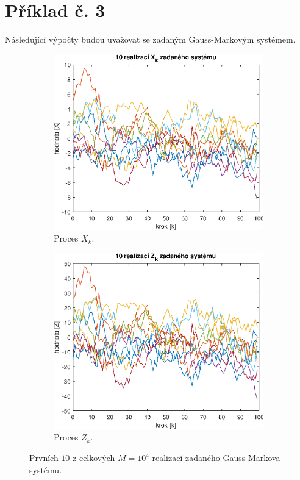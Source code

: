 \documentclass{article}
\begin{document}
	\section{Příklad č. 3}
		Následující výpočty budou uvažovat se zadaným Gauss-Markovým systémem.
		\begin{figure}[H]
			\begin{subfigure}[h]{.5\textwidth}
				\centering
				\includegraphics[width=\textwidth]{./Graphics/priklad_03_realizace_procesu_X}
				\caption{Proces \(X_{k}\).}
			\end{subfigure}
			\hfill
			\begin{subfigure}[h]{.5\textwidth}
				\centering
				\includegraphics[width=\textwidth]{./Graphics/priklad_03_realizace_procesu_Z}
				\caption{Proces \(Z_{k}\).}
			\end{subfigure}
			\caption{Prvních \(10\) z celkových \(M=10^{4}\) realizací zadaného Gauss-Markova systému.}
			\label{pic:priklad_03_realizace_procesu_X_a_Z}
		\end{figure}
\end{document}
